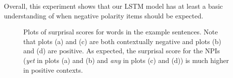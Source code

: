 \documentclass[11pt, round]{article}
\begin{document}
Overall, this experiment shows that our LSTM model has at least a basic understanding of when negative polarity items should be expected.

\begin{figure}
    \centering
    \qquad
    \caption{Plots of surprisal scores for words in the example sentences. Note that plots (a) and (c) are both contextually negative and plots (b) and (d) are positive. As expected, the surprisal score for the NPIs (\textit{yet} in plots (a) and (b) and \textit{any} in plots (c) and (d)) is much higher in positive contexts.}
    \label{fig:surprisal-basic-licensing}
\end{figure}
\end{document}
